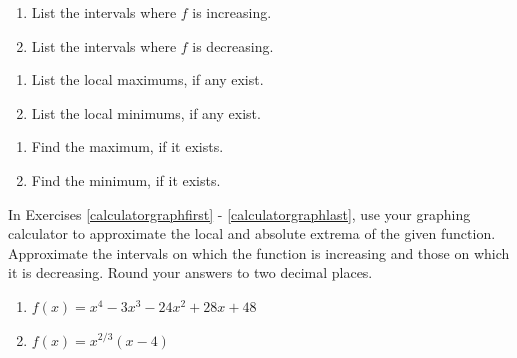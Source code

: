\begin{multicols}{2}
\begin{enumerate}
\setcounter{enumi}{\value{HW}}

\item  List the intervals where $f$ is increasing.
\item  List the intervals where $f$ is decreasing.

\setcounter{HW}{\value{enumi}}
\end{enumerate}
\end{multicols}

\begin{multicols}{2}
\begin{enumerate}
\setcounter{enumi}{\value{HW}}

\item  List the local maximums, if any exist.
\item  List the local minimums, if any exist.

\setcounter{HW}{\value{enumi}}
\end{enumerate}
\end{multicols}

\begin{multicols}{2}
\begin{enumerate}
\setcounter{enumi}{\value{HW}}

\item  Find the maximum, if it exists.
\item  Find the minimum, if it exists. \label{usesecondfuncgraphlast}

\setcounter{HW}{\value{enumi}}
\end{enumerate}
\end{multicols}

In Exercises \ref{calculatorgraphfirst} - \ref{calculatorgraphlast}, use your graphing calculator to approximate the local and absolute extrema of the given function.  Approximate the intervals on which the function is increasing and those on which it is decreasing.  Round your answers to two decimal places.  

\begin{multicols}{2}
\begin{enumerate}
\setcounter{enumi}{\value{HW}}

\item $f(x) = x^{4} - 3x^{3} - 24x^{2} + 28x + 48$ \label{calculatorgraphfirst}
\item $f(x) = x^{2/3}(x - 4)$

\setcounter{HW}{\value{enumi}}
\end{enumerate}
\end{multicols}


